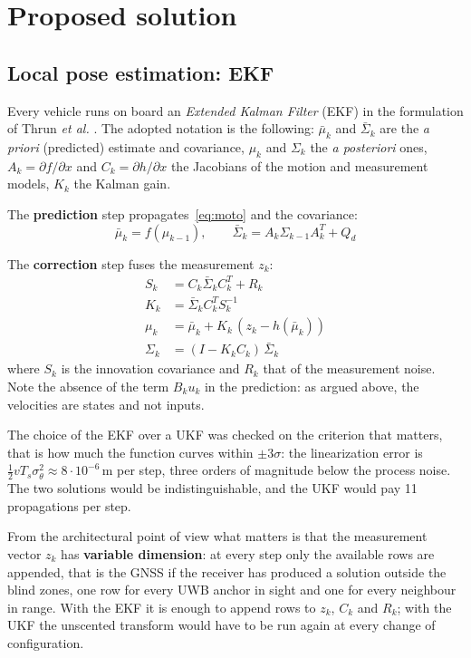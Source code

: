 \documentclass[conference,9pt]{IEEEtran}
\begin{document}
\section{Proposed solution}
\label{sec:soluzione}

\subsection{Local pose estimation: EKF}

Every vehicle runs on board an \emph{Extended Kalman Filter} (EKF) in the
formulation of Thrun \emph{et al.} \cite{thrun2005}. The adopted notation is
the following: $\bar\mu_k$ and $\bar\Sigma_k$ are the \emph{a priori}
(predicted) estimate and covariance, $\mu_k$ and $\Sigma_k$ the \emph{a
posteriori} ones, $A_k = \partial f/\partial x$ and
$C_k = \partial h/\partial x$ the Jacobians of the motion and measurement
models, $K_k$ the Kalman gain.

The \textbf{prediction} step propagates~\eqref{eq:moto} and the covariance:
\begin{equation}
\bar\mu_k = f(\mu_{k-1}), \qquad
\bar\Sigma_k = A_k \Sigma_{k-1} A_k^T + Q_d
\end{equation}

The \textbf{correction} step fuses the measurement $z_k$:
\begin{align}
S_k &= C_k \bar\Sigma_k C_k^T + R_k\\
K_k &= \bar\Sigma_k C_k^T S_k^{-1}\\
\mu_k &= \bar\mu_k + K_k\,(z_k - h(\bar\mu_k))\\
\Sigma_k &= (I - K_k C_k)\,\bar\Sigma_k
\end{align}
where $S_k$ is the innovation covariance and $R_k$ that of the measurement
noise. Note the absence of the term $B_k u_k$ in the prediction: as argued
above, the velocities are states and not inputs.

The choice of the EKF over a UKF was checked on the criterion that matters,
that is how much the function curves within $\pm 3\sigma$: the linearization
error is $\tfrac{1}{2}v T_s \sigma_\theta^2 \approx 8\cdot10^{-6}$\,m per step,
three orders of magnitude below the process noise. The two solutions would be
indistinguishable, and the UKF would pay 11 propagations per step.

From the architectural point of view what matters is that the measurement
vector $z_k$ has \textbf{variable dimension}: at every step only the available
rows are appended, that is the GNSS if the receiver has produced a solution
outside the blind zones, one row for every UWB anchor in sight and one for
every neighbour in range. With the EKF it is enough to append rows to $z_k$,
$C_k$ and $R_k$; with the UKF the unscented transform would have to be run
again at every change of configuration.
\end{document}
